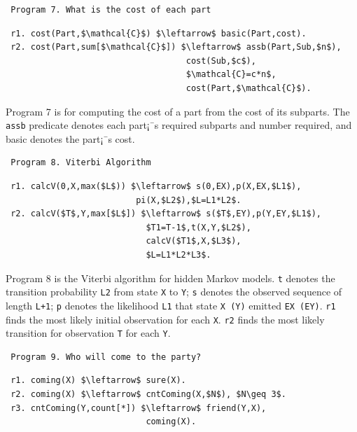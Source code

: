 \begin{appendix}
 \begin{verbatim}
 Program 7. What is the cost of each part
 \end{verbatim}\vspace{-0.1in}\small
 \begin{lstlisting}
 r1. cost(Part,$\mathcal{C}$) $\leftarrow$ basic(Part,cost).
 r2. cost(Part,sum[$\mathcal{C}$]) $\leftarrow$ assb(Part,Sub,$n$),
                                    cost(Sub,$c$),
                                    $\mathcal{C}=c*n$,
                                    cost(Part,$\mathcal{C}$).
 \end{lstlisting}
 \normalsize
 
 Program 7 \cite{7113340} is for computing the cost of a part from the cost of its subparts. The \texttt{assb} predicate denotes each part¡¯s required subparts and number required, and basic denotes the part¡¯s cost.
 
 \begin{verbatim}
 Program 8. Viterbi Algorithm
 \end{verbatim}\vspace{-0.1in}\small
 \begin{lstlisting}
 r1. calcV(0,X,max($L$)) $\leftarrow$ s(0,EX),p(X,EX,$L1$),
                          pi(X,$L2$),$L=L1*L2$.
 r2. calcV($T$,Y,max[$L$]) $\leftarrow$ s($T$,EY),p(Y,EY,$L1$),
                            $T1=T-1$,t(X,Y,$L2$),
                            calcV($T1$,X,$L3$),
                            $L=L1*L2*L3$.
 \end{lstlisting}
 \normalsize
 
 Program 8 \cite{7113340} is the Viterbi algorithm for hidden Markov models. \texttt{t} denotes the transition probability \texttt{L2} from state \texttt{X} to \texttt{Y}; \texttt{s} denotes the observed sequence of length \texttt{L+1}; \texttt{p} denotes the likelihood \texttt{L1} that state \texttt{X (Y)} emitted \texttt{EX (EY)}. \texttt{r1} finds the most likely initial observation for each \texttt{X}. \texttt{r2} finds the most likely transition for observation \texttt{T} for each \texttt{Y}.
 
 \begin{verbatim}
 Program 9. Who will come to the party?
 \end{verbatim}\small
 \begin{lstlisting}
 r1. coming(X) $\leftarrow$ sure(X).
 r2. coming(X) $\leftarrow$ cntComing(X,$N$), $N\geq 3$.
 r3. cntComing(Y,count[*]) $\leftarrow$ friend(Y,X),
                            coming(X).
 \end{lstlisting}
 \normalsize
 

\end{appendix}
